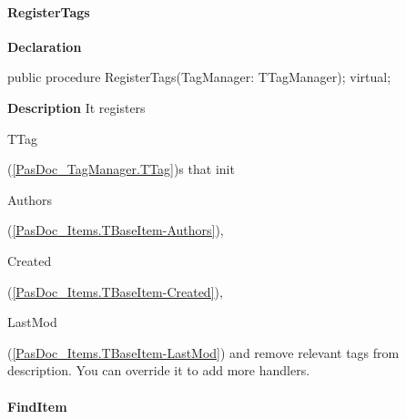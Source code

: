 \documentclass{report}
\newif\ifpdf
\begin{document}
\paragraph*{RegisterTags}\hspace*{\fill}

\label{PasDoc_Items.TBaseItem-RegisterTags}
\begin{list}{}{
\setlength{\itemindent}{0cm}
\setlength{\listparindent}{0cm}
\setlength{\leftmargin}{\evensidemargin}
\addtolength{\leftmargin}{\tmplength}
\settowidth{\labelsep}{X}
\addtolength{\leftmargin}{\labelsep}
\setlength{\labelwidth}{\tmplength}
}
\item[\textbf{Declaration}\hfill]
\ifpdf
\begin{flushleft}
\fi
\begin{ttfamily}
public procedure RegisterTags(TagManager: TTagManager); virtual;\end{ttfamily}

\ifpdf
\end{flushleft}
\fi

\par
\item[\textbf{Description}]
It registers \begin{ttfamily}TTag\end{ttfamily}(\ref{PasDoc_TagManager.TTag})s that init \begin{ttfamily}Authors\end{ttfamily}(\ref{PasDoc_Items.TBaseItem-Authors}), \begin{ttfamily}Created\end{ttfamily}(\ref{PasDoc_Items.TBaseItem-Created}), \begin{ttfamily}LastMod\end{ttfamily}(\ref{PasDoc_Items.TBaseItem-LastMod}) and remove relevant tags from description. You can override it to add more handlers.

\end{list}
\paragraph*{FindItem}\hspace*{\fill}
\end{document}
